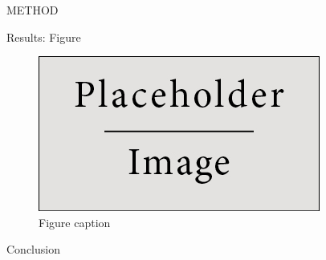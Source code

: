 \documentclass[final,hyperref={pdfpagelabels=false}]{beamer}
\begin{document}
\begin{frame}[t]
\begin{columns}[t]
\begin{column}{.465\textwidth}
\begin{block}{METHOD}

     
\end{block}


\begin{block}{Results: Figure}

\begin{figure}
\includegraphics[width=0.8\linewidth]{placeholder.jpg}
\caption{Figure caption}
\end{figure}

\end{block}


\begin{block}{Conclusion}


\end{block}
\end{column}
\end{columns}
\end{frame}
\end{document}
